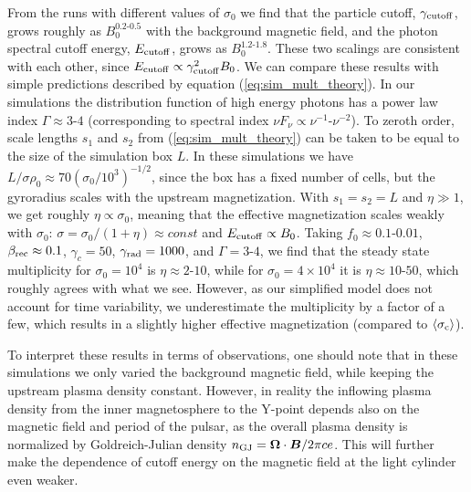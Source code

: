 From the runs with different values of $\sigma_0$ we find that the particle cutoff, $\gamma_{\rm cutoff}$, grows roughly as $B_0^{0.2\text{-}0.5}$ with the background magnetic field, and the photon spectral cutoff energy, $E_{\rm cutoff}$, grows as $B_0^{1.2\text{-}1.8}$. These two scalings are consistent with each other, since $E_{\rm cutoff}\propto \gamma_{\rm cutoff}^2 B_0$. We can compare these results with simple predictions described by equation (\ref{eq:sim_mult_theory}). In our simulations the distribution function of high energy photons has a power law index $\Gamma\approx 3\text{-}4$ (corresponding to spectral index $\nu F_{\nu}\propto \nu^{-1}\text{-}\nu^{-2}$). To zeroth order, scale lengths $s_1$ and $s_2$ from  (\ref{eq:sim_mult_theory}) can be taken to be equal to the size of the simulation box $L$. In these simulations we have $L / \sigma \rho_0 \approx 70 (\sigma_0 / 10^3)^{-1/2}$, since the box has a fixed number of cells, but the gyroradius scales with the upstream magnetization. With $s_1 = s_2 = L$ and $\eta \gg 1$, we get roughly $\eta \propto \sigma_0$, meaning that the effective magnetization scales weakly with $\sigma_0$: $\sigma = \sigma_0 / (1+\eta) \approx const$ and $E_{\rm cutoff}\propto B_0$.
Taking $f_0\approx 0.1\text{-}0.01$, $\beta_{\rm rec}\approx 0.1$, $\gamma_c = 50$, $\gamma_{\rm rad} = 1000$, and $\Gamma=3\text{-}4$, we find that the steady state multiplicity for $\sigma_0=10^4$ is $\eta\approx 2\text{-}10$, while for $\sigma_0 = 4\times 10^4$ it is $\eta\approx 10\text{-}50$, which roughly agrees with what we see. However, as our simplified model does not account for time variability, we underestimate the multiplicity by a factor of a few, which results in a slightly higher effective magnetization (compared to $\langle\sigma_{\rm c}\rangle$).

To interpret these results in terms of observations, one should note that in these simulations we only varied the background magnetic field, while keeping the upstream plasma density constant. However, in reality the inflowing plasma density from the inner magnetosphere to the Y-point depends also on the magnetic field and period of the pulsar, as the overall plasma density is normalized by Goldreich-Julian density $n_{\rm GJ}=\bm{\Omega}\cdot\bm{B}/2\pi ce$. This will further make the dependence of cutoff energy on the magnetic field at the light cylinder even weaker.


